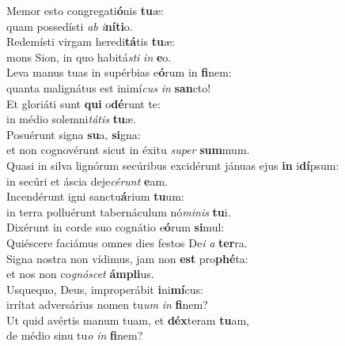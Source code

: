 \evenverse Memor esto congregati\textbf{ó}nis \textbf{tu}æ:~\*\\
\evenverse quam possedísti \textit{ab} \textit{i}\textbf{ní}\textbf{ti}o.\\
\oddverse Redemísti virgam heredi\textbf{tá}tis \textbf{tu}æ:~\*\\
\oddverse mons Sion, in quo habitá\textit{sti} \textit{in} \textbf{e}o.\\
\evenverse Leva manus tuas in supérbias e\textbf{ó}rum in \textbf{fi}nem:~\*\\
\evenverse quanta malignátus est inimí\textit{cus} \textit{in} \textbf{san}cto!\\
\oddverse Et gloriáti sunt \textbf{qui} o\textbf{dé}runt te:~\*\\
\oddverse in médio solemni\textit{tá}\textit{tis} \textbf{tu}æ.\\
\evenverse Posuérunt signa \textbf{su}a, \textbf{si}gna:~\*\\
\evenverse et non cognovérunt sicut in éxitu \textit{su}\textit{per} \textbf{sum}mum.\\
\oddverse Quasi in silva lignórum secúribus excidérunt jánuas ejus \textbf{in} i\textbf{dí}psum:~\*\\
\oddverse in secúri et áscia deje\textit{cé}\textit{runt} \textbf{e}am.\\
\evenverse Incendérunt igni sanctu\textbf{á}rium \textbf{tu}um:~\*\\
\evenverse in terra polluérunt tabernáculum nó\textit{mi}\textit{nis} \textbf{tu}i.\\
\oddverse Dixérunt in corde suo cognátio e\textbf{ó}rum \textbf{si}mul:~\*\\
\oddverse Quiéscere faciámus omnes dies festos De\textit{i} \textit{a} \textbf{ter}ra.\\
\evenverse Signa nostra non vídimus, jam non \textbf{est} pro\textbf{phé}ta:~\*\\
\evenverse et nos non co\textit{gnó}\textit{scet} \textbf{ám}\textbf{pli}us.\\
\oddverse Usquequo, Deus, improperábit \textbf{i}ni\textbf{mí}cus:~\*\\
\oddverse irrítat adversárius nomen tu\textit{um} \textit{in} \textbf{fi}nem?\\
\evenverse Ut quid avértis manum tuam, et \textbf{déx}teram \textbf{tu}am,~\*\\
\evenverse de médio sinu tu\textit{o} \textit{in} \textbf{fi}nem?\\
